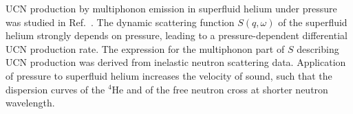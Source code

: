 

UCN production by multiphonon emission in superfluid helium under
pressure was studied in Ref.~\cite{Schmidt2009}.  The dynamic
scattering function $S(q,\omega)$ of the superfluid helium strongly
depends on pressure, leading to a pressure-dependent differential UCN
production rate. The expression for the multiphonon part of $S$
describing UCN production was derived from inelastic neutron
scattering data.  Application of pressure to superfluid helium
increases the velocity of sound, such that the dispersion curves of
the $^4$He and of the free neutron cross at shorter neutron
wavelength.

